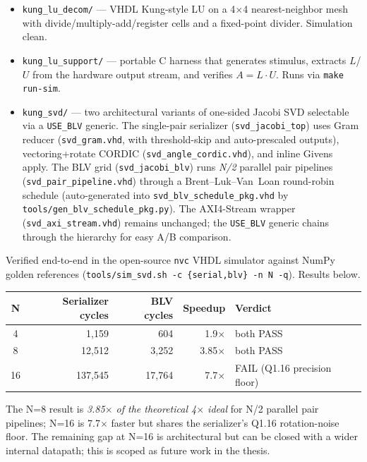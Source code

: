 \documentclass[11pt,letterpaper]{article}
\newcommand{\ttp}[1]{\texttt{\small #1}}
\begin{document}
\begin{itemize}
  \item \ttp{kung\_lu\_decom/} --- VHDL Kung-style LU on a 4$\times$4 nearest-neighbor mesh with divide/multiply-add/register cells and a fixed-point divider. Simulation clean.
  \item \ttp{kung\_lu\_support/} --- portable C harness that generates stimulus, extracts $L$/$U$ from the hardware output stream, and verifies $A = L \cdot U$. Runs via \ttp{make run-sim}.
  \item \ttp{kung\_svd/} --- two architectural variants of one-sided Jacobi SVD selectable via a \ttp{USE\_BLV} generic. The single-pair serializer (\ttp{svd\_jacobi\_top}) uses Gram reducer (\ttp{svd\_gram.vhd}, with threshold-skip and auto-prescaled outputs), vectoring+rotate CORDIC (\ttp{svd\_angle\_cordic.vhd}), and inline Givens apply. The BLV grid (\ttp{svd\_jacobi\_blv}) runs \emph{N/2} parallel pair pipelines (\ttp{svd\_pair\_pipeline.vhd}) through a Brent--Luk--Van~Loan round-robin schedule (auto-generated into \ttp{svd\_blv\_schedule\_pkg.vhd} by \ttp{tools/gen\_blv\_schedule\_pkg.py}). The AXI4-Stream wrapper (\ttp{svd\_axi\_stream.vhd}) remains unchanged; the \ttp{USE\_BLV} generic chains through the hierarchy for easy A/B comparison.
\end{itemize}

Verified end-to-end in the open-source \ttp{nvc} VHDL simulator against NumPy golden references (\ttp{tools/sim\_svd.sh -c \{serial,blv\} -n N -q}). Results below.

\begin{center}
\begin{tabular}{c r r r l}
\toprule
\textbf{N} & \textbf{Serializer cycles} & \textbf{BLV cycles} & \textbf{Speedup} & \textbf{Verdict} \\
\midrule
 4 &   1,159 &    604 & 1.9$\times$ & both PASS \\
 8 &  12,512 &  3,252 & 3.85$\times$ & both PASS \\
16 & 137,545 & 17,764 & 7.7$\times$ & FAIL (Q1.16 precision floor) \\
\bottomrule
\end{tabular}
\end{center}

The N=8 result is \emph{3.85$\times$ of the theoretical 4$\times$ ideal} for N/2 parallel pair pipelines; N=16 is 7.7$\times$ faster but shares the serializer's Q1.16 rotation-noise floor. The remaining gap at N=16 is architectural but can be closed with a wider internal datapath; this is scoped as future work in the thesis.
\end{document}

